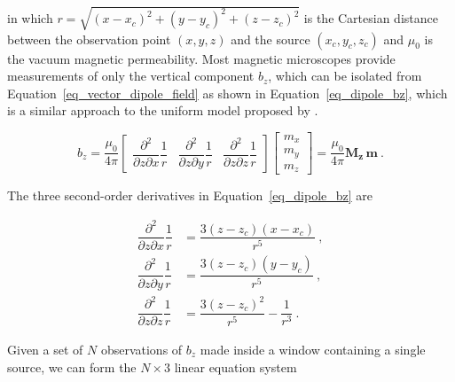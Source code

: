 \noindent
in which $r = \sqrt{(x - x_c)^2 + (y - y_c)^2 + (z - z_c)^2}$ is the Cartesian distance between the observation point $(x, y, z)$ and the source $(x_c, y_c, z_c)$ and $\mu_0$ is the vacuum magnetic permeability. Most magnetic microscopes provide measurements of only the vertical component $b_z$, which can be isolated from Equation~\ref{eq_vector_dipole_field} as shown in Equation~\ref{eq_dipole_bz}, which is a similar approach to the uniform model proposed by \cite{Weiss2007}.

\begin{equation}
\label{eq_dipole_bz}
b_z
= \dfrac{\mu_0}{4\pi}
\begin{bmatrix}
\dfrac{\partial^2}{\partial z \partial x} \dfrac{1}{r}
& \dfrac{\partial^2}{\partial z \partial y} \dfrac{1}{r}
& \dfrac{\partial^2}{\partial z \partial z} \dfrac{1}{r}
\end{bmatrix}
\begin{bmatrix}
m_x \\ m_y \\ m_z
\end{bmatrix}
= \dfrac{\mu_0}{4\pi} \mathbf{M_z}\,\mathbf{m}
\ .
\end{equation}

The three second-order derivatives in Equation~\ref{eq_dipole_bz} are

\begin{equation}
\begin{aligned}
\dfrac{\partial^2}{\partial z \partial x} \dfrac{1}{r} &=
\dfrac{3(z - z_c)(x - x_c)}{r^5}\ ,
\\
\dfrac{\partial^2}{\partial z \partial y} \dfrac{1}{r} &=
\dfrac{3(z - z_c)(y - y_c)}{r^5}\ ,
\\
\dfrac{\partial^2}{\partial z \partial z} \dfrac{1}{r} &=
\dfrac{3(z - z_c)^2}{r^5} - \dfrac{1}{r^3}\ .
\end{aligned}
\end{equation}

Given a set of $N$ observations of $b_z$ made inside a window containing a single source, we can form the $N \times 3$ linear equation system

